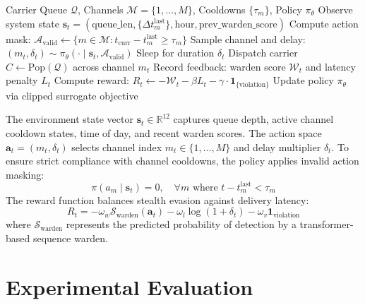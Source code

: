 \documentclass[conference]{IEEEtran}
\begin{document}
\begin{algorithm}[t]
\caption{PPO Action-Masked Stealth Scheduling}
\label{alg:ppo}
\begin{algorithmic}[1]
\REQUIRE Carrier Queue $\mathcal{Q}$, Channels $\mathcal{M} = \{1, \dots, M\}$, Cooldowns $\{\tau_m\}$, Policy $\pi_{\theta}$
    \STATE Observe system state $\mathbf{s}_t = (\text{queue\_len}, \{\Delta t_m^{\text{last}}\}, \text{hour}, \text{prev\_warden\_score})$
    \STATE Compute action mask: $\mathcal{A}_{\text{valid}} \leftarrow \{m \in \mathcal{M} : t_{\text{curr}} - t_m^{\text{last}} \ge \tau_m\}$
    \STATE Sample channel and delay: $(m_t, \delta_t) \sim \pi_{\theta}(\cdot \mid \mathbf{s}_t, \mathcal{A}_{\text{valid}})$
    \STATE Sleep for duration $\delta_t$
    \STATE Dispatch carrier $C \leftarrow \text{Pop}(\mathcal{Q})$ across channel $m_t$
    \STATE Record feedback: warden score $\mathcal{W}_t$ and latency penalty $L_t$
    \STATE Compute reward: $R_t \leftarrow -\mathcal{W}_t - \beta L_t - \gamma \cdot \mathbf{1}_{\{\text{violation}\}}$
    \STATE Update policy $\pi_{\theta}$ via clipped surrogate objective
\ENDWHILE
\end{algorithmic}
\end{algorithm}

The environment state vector $\mathbf{s}_t \in \mathbb{R}^{12}$ captures queue depth, active channel cooldown states, time of day, and recent warden scores. The action space $\mathbf{a}_t = (m_t, \delta_t)$ selects channel index $m_t \in \{1, \dots, M\}$ and delay multiplier $\delta_t$. To ensure strict compliance with channel cooldowns, the policy applies invalid action masking:
\begin{equation}
\pi(a_m \mid \mathbf{s}_t) = 0, \quad \forall m \text{ where } t - t_m^{\text{last}} < \tau_m
\end{equation}
The reward function balances stealth evasion against delivery latency:
\begin{equation}
R_t = -\omega_w \mathcal{S}_{\text{warden}}(\mathbf{a}_t) - \omega_l \log(1 + \delta_t) - \omega_v \mathbf{1}_{\text{violation}}
\end{equation}
where $\mathcal{S}_{\text{warden}}$ represents the predicted probability of detection by a transformer-based sequence warden.

\section{Experimental Evaluation}
\end{document}
